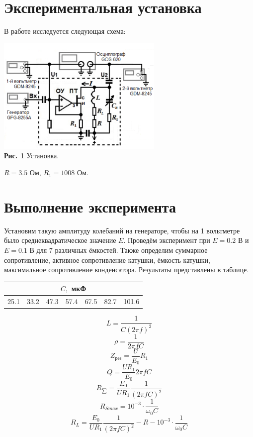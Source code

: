 \documentclass[a4paper, 12pt]{article}%
\begin{document}
\section*{Экспериментальная установка}

В работе исследуется следующая схема:
\begin{center}
\includegraphics[width=0.6\textwidth]{U.png}\\
\textbf{Рис. 1} Установка.
\end{center}

$R=3.5$ Ом,
$R_1 = 1008$ Ом.
\section*{Выполнение эксперимента}
Установим такую амплитуду колебаний на генераторе, чтобы на 1 вольтметре было среднеквадратическое значение $E$. Проведём эксперимент при $E=0.2$ В и $E=0.1$ В для 7 различных ёмкостей. Также определим суммарное сопротивление, активное сопротивление катушки, ёмкость катушки, максимальное сопротивление конденсатора. Результаты представлены в таблице. 
\begin{table}[!ht]
\center
\begin{tabular}{|c|c|c|c|c|c|c|}
\hline
\multicolumn{7}{|c|}{$C,$ мкФ}                  \\ \hline
25.1 & 33.2 & 47.3 & 57.4 & 67.5 & 82.7 & 101.6 \\ \hline
\end{tabular}
\end{table}


\[L=\frac{1}{C(2\pi f)^2} \]
\[\rho=\frac{1}{2\pi fC} \]
\[Z_{\text{рез}}=\frac{U}{E_0}R_1\]
\[Q=\frac{UR_1}{E_0}2\pi fC\]
\[R_{\sum}=\frac{E_0}{UR_1}\frac{1}{(2\pi fC)^2}\]
\[R_{Smax}=10^{-3}\cdot\frac{1}{\omega_0C}\]
\[R_L=\frac{E_0}{UR_1}\frac{1}{(2\pi fC)^2}-R-10^{-3}\cdot\frac{1}{\omega_0C}\]
\end{document}
